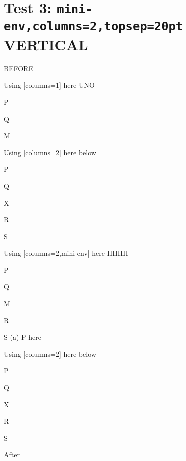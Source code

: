 \documentclass[12pt]{article}
\begin{document}
\section{Test 3: \texttt{mini-env,columns=2,topsep=20pt} VERTICAL}

BEFORE
\begin{enumext}[columns=2]
\item Using [columns=1] here UNO

  \begin{enumext}[columns=1,topsep=20pt]%
     \item  P \item Q \item M %
  \end{enumext}

\item Using [columns=2] here below

\begin{enumext}[columns=2,topsep=20pt]%
     \item  P \item Q \item X  \item R \item S
  \end{enumext}

\columnbreak

\item Using [columns=2,mini-env] here HHHH

  \begin{enumext}[columns=2,mini-env={0.4\linewidth},topsep=20pt]%
    \item  P \item Q \item M \item R \item S
    \miniright
    (a) P here
  \end{enumext}

\item Using [columns=2] here below

\begin{enumext}[columns=2,topsep=20pt]%
     \item  P \item Q \item X  \item R \item S
  \end{enumext}

\end{enumext}
After
\end{document}
